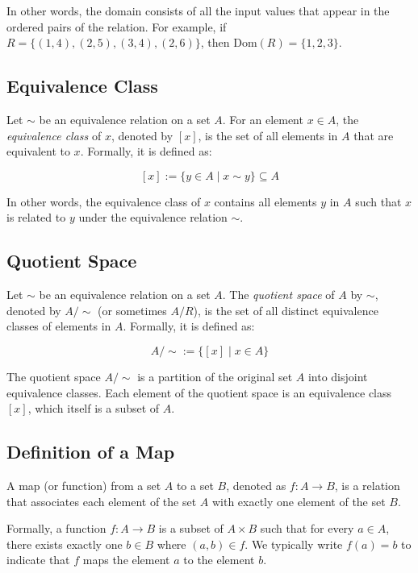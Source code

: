 In other words, the domain consists of all the input values that appear in the ordered pairs of the 
relation. For example, if \(R = \{(1,4), (2,5), (3,4), (2,6)\}\), then \(\text{Dom}(R) = \{1, 2, 3\}\).

\subsection{Equivalence Class}

Let \(\sim\) be an equivalence relation on a set \(A\). For an element \(x \in A\), the 
\emph{equivalence class} of \(x\), denoted by \([x]\), is the set of all elements in \(A\) that are 
equivalent to \(x\). Formally, it is defined as:

\[
	[x] := \{y \in A \mid x \sim y\} \subseteq A
\]

In other words, the equivalence class of \(x\) contains all elements \(y\) in \(A\) such that 
\(x\) is related to \(y\) under the equivalence relation \(\sim\).

\subsection{Quotient Space}

Let \(\sim\) be an equivalence relation on a set \(A\). The \emph{quotient space} of \(A\) by 
\(\sim\), denoted by \(A/\sim\) (or sometimes \(A/R\)), is the set of all distinct equivalence classes of 
elements in \(A\). Formally, it is defined as:

\[
	A/\sim := \{[x] \mid x \in A\}
\]

The quotient space \(A/\sim\) is a partition of the original set \(A\) into disjoint equivalence classes. 
Each element of the quotient space is an equivalence class \([x]\), which itself is a subset of \(A\).

\subsection{Definition of a Map}

A map (or function) from a set \(A\) to a set \(B\), denoted as \(f: A \to B\), is a relation that 
associates each element of the set \(A\) with exactly one element of the set \(B\).

Formally, a function \(f: A \to B\) is a subset of \(A \times B\) such that for every \(a \in A\), there 
exists exactly one \(b \in B\) where \((a,b) \in f\). We typically write \(f(a) = b\) to indicate that 
\(f\) maps the element \(a\) to the element \(b\).

